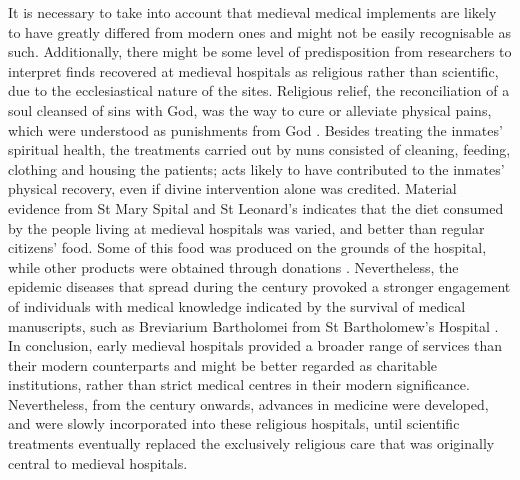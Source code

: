 \documentclass[%
	]{ijsra}
\begin{document}
It is necessary to take into account that medieval medical implements are likely to have greatly differed from modern ones and might not be easily recognisable as such. Additionally, there might be some level of predisposition from researchers to interpret finds recovered at medieval hospitals as religious rather than scientific, due to the ecclesiastical nature of the sites. 
Religious relief, the reconciliation of a soul cleansed of sins with God, was the way to cure or alleviate physical pains, which were understood as punishments from God \parencites[12-13,96]{Biller_2001}[42-43]{Rawcliffe_1995}. 
Besides treating the inmates’ spiritual health, the treatments carried out by nuns consisted of cleaning, feeding, clothing and housing the patients; acts likely to have contributed to the inmates’ physical recovery, even if divine intervention alone was credited. Material evidence from St Mary Spital and St Leonard’s indicates that the diet consumed by the people living at medieval hospitals was varied, and better than regular citizens’ food. Some of this food was produced on the grounds of the hospital, while other products were obtained through donations \parencites[76]{Egan_2007}[208]{Malcom_2014}.
Nevertheless, the epidemic diseases that spread during the  century \AD provoked a stronger engagement of individuals with medical knowledge indicated by the survival of medical manuscripts, 
such as Breviarium Bartholomei from St Bartholomew’s Hospital \parencite[6,16-22]{Stell_1996}. 
In conclusion, early medieval hospitals provided a broader range of services than their modern counterparts and might be better regarded as charitable institutions, rather than strict medical centres in their modern significance. Nevertheless, from the  century \AD onwards, advances in medicine were developed, and were slowly incorporated into these religious hospitals, until scientific treatments eventually replaced the exclusively religious care that was originally central to medieval hospitals. 

\IJSRAclosing%
\end{document}
